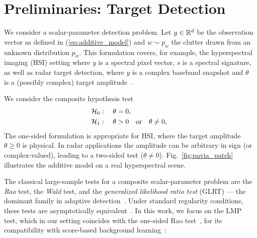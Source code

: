 \chapter{Preliminaries: Target Detection}
\label{chap:preliminaries}
We consider a scalar-parameter detection problem.  Let $y \in \mathbb{R}^d$ be
the observation vector as defined in (\ref{eq:additive_model}) and
$w \sim p_w$ the clutter drawn from an unknown distribution $p_w$. This formulation covers, for example, the hyperspectral imaging (HSI)
setting where $y$ is a spectral pixel vector, $s$ is a spectral
signature, as well as radar target
detection, where $y$ is a complex baseband snapshot and $\theta$ is a (possibly complex) target amplitude~\cite{kelly1986adaptive,kay1998detection}.

We consider the composite hypothesis test
\begin{align}
    \mathcal{H}_0 &: \quad \theta = 0 , \nonumber \\
    \mathcal{H}_1  &: \quad \theta > 0 \quad \text{or} \quad \theta \neq 0,
    \label{eq:hypotheses}
\end{align}
The
one-sided formulation is appropriate for HSI, where the target amplitude
$\theta \geq 0$ is physical.  In radar applications the amplitude can be
arbitrary in sign (or complex-valued), leading to a two-sided test ($\theta \neq 0 $).
Fig.~\ref{fig:pavia_patch} illustrates the additive model on a real hyperspectral scene.




The classical large-sample tests for a composite scalar-parameter problem are the
\emph{Rao} test, the \emph{Wald} test, and the \emph{generalized
likelihood ratio test} (GLRT) --- the dominant family in adaptive
detection~\cite{kelly1986adaptive,robey1992cfar,kraut2001adaptive,vinGRLT}.
Under standard regularity conditions, these tests are asymptotically
equivalent~\cite{kay1998detection}. In this work, we focus on the LMP test,
which in our setting coincides with the one-sided Rao
test~\cite{rao1948large}, for its compatibility with score-based background
learning~\cite{kay1989asymptotically,demaio2007rao}:



